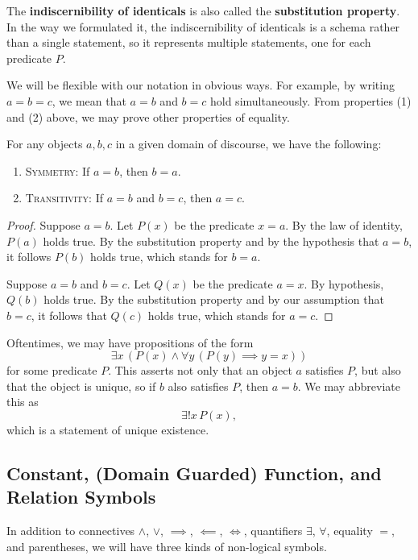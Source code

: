 \noindent The \textbf{indiscernibility of identicals} is also called the \textbf{substitution property}.
In the way we formulated it, the indiscernibility of identicals is a schema rather than a single statement, so it represents multiple statements, one for each predicate $P$. 

We will be flexible with our notation in obvious ways.
For example, by writing $a = b = c$, we mean that $a = b$ and $b = c$ hold simultaneously. 
From properties (1) and (2) above, we may prove other properties of equality.

\begin{prop}
	For any objects $a, b, c$ in a given domain of discourse, we have the following:
	\begin{enumerate}[itemsep=-0.4ex, label=\textup{(\alph*)}]
		\item\textsc{Symmetry:} If $a = b$, then $b = a$. 
		\item\textsc{Transitivity:} If $a = b$ and $b = c$, then $a = c$.
	\end{enumerate}
\end{prop}
\begin{proof}
	Suppose $a = b$. 
	Let $P(x)$ be the predicate $x = a$. 
	By the law of identity, $P(a)$ holds true. 
	By the substitution property and by the hypothesis that $a = b$, it follows $P(b)$ holds true, which stands for $b = a$. 
	
	Suppose $a = b$ and $b = c$. 
	Let $Q(x)$ be the predicate $a = x$. 
	By hypothesis, $Q(b)$ holds true. 
	By the substitution property and by our assumption that $b = c$, it follows that $Q(c)$ holds true, which stands for $a = c$. 
\end{proof}

Oftentimes, we may have propositions of the form
\[ \exists x\, (P(x)\land \forall y\, (P(y)\implies y=x)) \]
for some predicate $P$.
This asserts not only that an object $a$ satisfies $P$, but also that the object is unique, so if $b$ also satisfies $P$, then $a = b$.
We may abbreviate this as 
\[ \exists ! x\, P(x), \] 
which is a statement of unique existence. 

\subsection{Constant, (Domain Guarded) Function, and Relation Symbols}

In addition to connectives $\land$, $\lor$, $\!\implies\!$, $\!\impliedby\!$, $\!\iff\!$, quantifiers $\exists$, $\forall$, equality $=$, and parentheses, we will have three kinds of non-logical symbols. 

